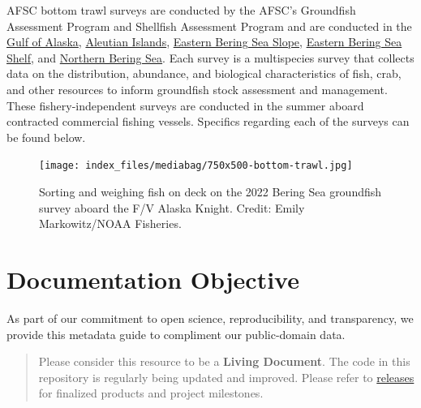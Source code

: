 \documentclass[
  letterpaper,
  oneside,
  open=any]{scrbook}
\begin{document}
AFSC bottom trawl surveys are conducted by the AFSC's Groundfish
Assessment Program and Shellfish Assessment Program and are conducted in
the
\href{https://www.fisheries.noaa.gov/alaska/ecosystems/alaska-fish-research-surveys\#gulf-of-alaska-bottom-trawl-survey}{Gulf
of Alaska},
\href{https://www.fisheries.noaa.gov/alaska/ecosystems/alaska-fish-research-surveys\#aleutian-islands-bottom-trawl-survey}{Aleutian
Islands},
\href{https://www.fisheries.noaa.gov/alaska/ecosystems/alaska-fish-research-surveys\#eastern-bering-sea-upper-continental-slope-bottom-trawl-survey}{Eastern
Bering Sea Slope},
\href{https://www.fisheries.noaa.gov/alaska/ecosystems/alaska-fish-research-surveys\#eastern-bering-sea-shelf-bottom-trawl-survey}{Eastern
Bering Sea Shelf}, and
\href{https://www.fisheries.noaa.gov/alaska/ecosystems/alaska-fish-research-surveys\#northern-bering-sea-shelf-bottom-trawl-survey}{Northern
Bering Sea}. Each survey is a multispecies survey that collects data on
the distribution, abundance, and biological characteristics of fish,
crab, and other resources to inform groundfish stock assessment and
management. These fishery-independent surveys are conducted in the
summer aboard contracted commercial fishing vessels. Specifics regarding
each of the surveys can be found below.

\begin{figure}

{\centering \texttt{[image: index\_files/mediabag/750x500-bottom-trawl.jpg]}

}

\caption{Sorting and weighing fish on deck on the 2022 Bering Sea
groundfish survey aboard the F/V Alaska Knight. Credit: Emily
Markowitz/NOAA Fisheries.}

\end{figure}

\hypertarget{documentation-objective}{%
\section*{Documentation Objective}\label{documentation-objective}}


As part of our commitment to open science, reproducibility, and
transparency, we provide this metadata guide to compliment our
public-domain data.

\begin{quote}
Please consider this resource to be a \textbf{Living Document}. The code
in this repository is regularly being updated and improved. Please refer
to
\href{https://github.com/afsc-gap-products/gap_products/releases}{releases}
for finalized products and project milestones.
\end{quote}
\end{document}
